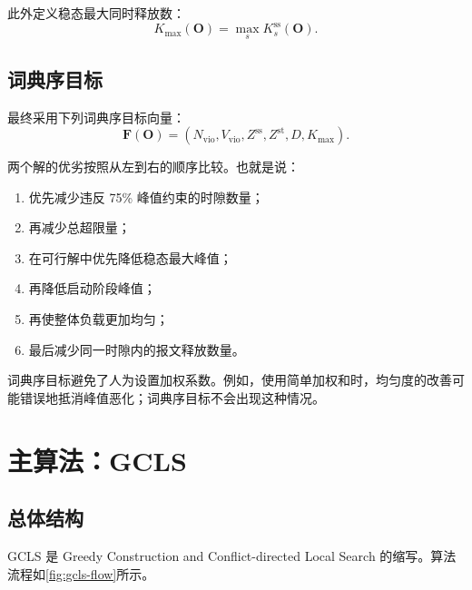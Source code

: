 \documentclass[UTF8,12pt,a4paper]{ctexart}
\begin{document}
此外定义稳态最大同时释放数：
\begin{equation}
 K_{\max}(\symbf{O})=\max_s K^{\mathrm{ss}}_s(\symbf{O}).
\end{equation}

\subsection{词典序目标}

最终采用下列词典序目标向量：
\begin{equation}
 \symbf{F}(\symbf{O})=
 \left(
 N_{\mathrm{vio}},
 V_{\mathrm{vio}},
 Z^{\mathrm{ss}},
 Z^{\mathrm{st}},
 D,
 K_{\max}
 \right).
\label{eq:lexicographic-objective}
\end{equation}

两个解的优劣按照从左到右的顺序比较。也就是说：

\begin{enumerate}
  \item 优先减少违反 75\% 峰值约束的时隙数量；
  \item 再减少总超限量；
  \item 在可行解中优先降低稳态最大峰值；
  \item 再降低启动阶段峰值；
  \item 再使整体负载更加均匀；
  \item 最后减少同一时隙内的报文释放数量。
\end{enumerate}

词典序目标避免了人为设置加权系数。例如，使用简单加权和时，均匀度的改善可能错误地抵消峰值恶化；词典序目标不会出现这种情况。

\section{主算法：GCLS}

\subsection{总体结构}

GCLS 是 Greedy Construction and Conflict-directed Local Search 的缩写。算法流程如\cref{fig:gcls-flow}所示。
\end{document}

